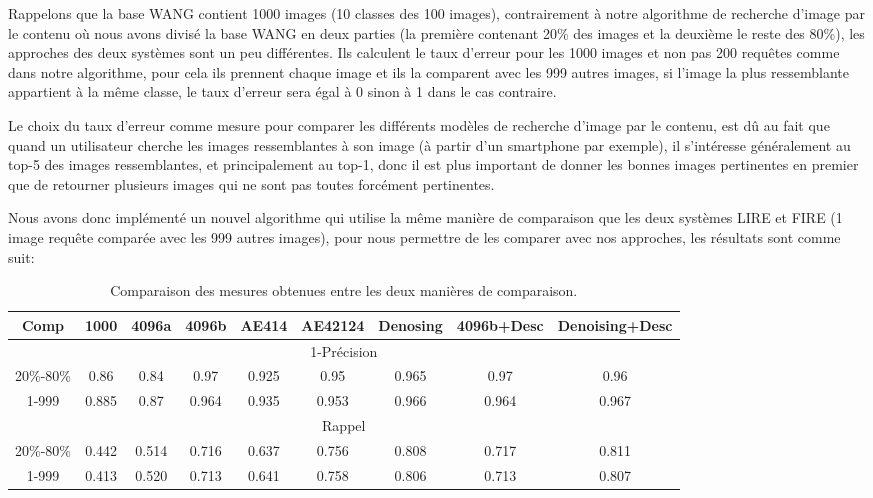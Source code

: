 	Rappelons que la base WANG contient 1000 images (10 classes des 100 images), contrairement à notre algorithme de recherche d'image par le contenu où nous avons divisé la base WANG en deux parties (la première contenant 20\% des images et la deuxième le reste des 80\%), les approches des deux systèmes sont un peu différentes. Ils calculent le taux d'erreur pour les 1000 images et non pas 200 requêtes comme dans notre algorithme, pour cela ils prennent chaque image et ils la comparent avec les 999 autres images, si l'image la plus ressemblante appartient à la même classe, le taux d'erreur sera égal à 0 sinon à 1 dans le cas contraire.

	Le choix du taux d'erreur comme mesure pour comparer les différents modèles de recherche d'image par le contenu, est dû au fait que quand un utilisateur cherche les images ressemblantes à son image (à partir d'un smartphone par exemple), il s'intéresse généralement au top-5 des images ressemblantes, et principalement au top-1, donc il est plus important de donner les bonnes images pertinentes en premier que de retourner plusieurs images qui ne sont pas toutes forcément pertinentes.
	
	Nous avons donc implémenté un nouvel algorithme qui utilise la même manière de comparaison que les deux systèmes LIRE et FIRE (1 image requête comparée avec les 999 autres images), pour nous permettre de les comparer avec nos approches, les résultats sont comme suit:

\begin{table}[H]
\begin{center}
\begin{tabular}{|c|c|c|c|c|c|c|c|c|}
\hline
	Comp & 1000 & 4096a & 4096b & AE414 & AE42124 & Denosing & 4096b+Desc & Denoising+Desc\\
\hline
	\multicolumn{9}{|c|}{1-Précision}\\
\hline
	20\%-80\% & 0.86 & 0.84 & 0.97 & 0.925 & 0.95 & 0.965 & 0.97 & 0.96\\
\hline
	1-999 & 0.885 & 0.87 & 0.964 & 0.935 & 0.953 & 0.966 & 0.964 & 0.967\\
\hline
	\multicolumn{9}{|c|}{Rappel}\\
\hline
	20\%-80\% & 0.442 & 0.514 & 0.716 & 0.637 & 0.756 & 0.808 & 0.717 & 0.811\\
\hline
	1-999 & 0.413 & 0.520 & 0.713 & 0.641 & 0.758 & 0.806 & 0.713 & 0.807\\
\hline
\end{tabular}
\end{center}
\caption{Comparaison des mesures obtenues entre les deux manières de comparaison.}
\end{table}

